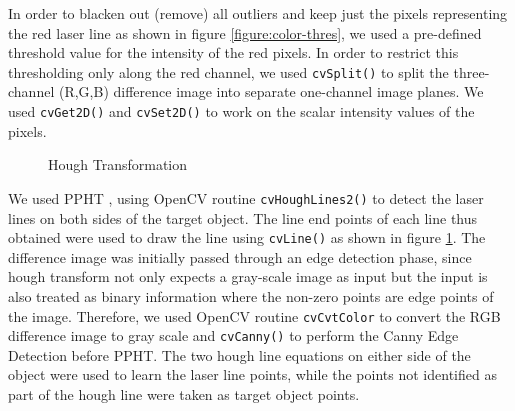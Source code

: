 In order to blacken out (remove) all outliers and keep just the pixels
representing the red laser line as shown in figure \ref{figure:color-thres},
we used a pre-defined threshold value for the intensity of the red pixels. In
order to restrict this thresholding only along the red channel, we used
\texttt{cvSplit()} to split the three-channel (R,G,B) difference image into
separate one-channel image planes. We used \texttt{cvGet2D()} and
\texttt{cvSet2D()} to work on the scalar intensity values of the pixels.

\begin{figure}[ht!]
\centering
{} \quad
{} \hfill
\caption{Hough Transformation}
\label{figure:hough-transform}
\end{figure}

We used \ac{PPHT} \cite{kiryati:1991}, \cite{matas:2000} using OpenCV routine
\texttt{cvHoughLines2()} to detect the laser lines on both sides of the target
object. The line end points of each line thus obtained were used to draw the
line using \texttt{cvLine()} as shown in figure \ref{figure:hough-transform}.
The difference image was initially passed through an edge detection phase,
since hough transform not only expects a gray-scale image as input but the
input is also treated as binary information where the non-zero points are edge
points of the image. Therefore, we used OpenCV routine \texttt{cvCvtColor} to
convert the RGB difference image to gray scale and \texttt{cvCanny()} to
perform the Canny Edge Detection \cite{canny:1986} before \ac{PPHT}. The two
hough line equations on either side of the object were used to learn the laser
line points, while the points not identified as part of the hough line were
taken as target object points.
